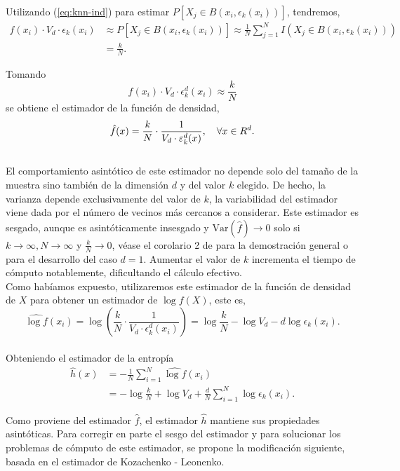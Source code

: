 \documentclass[12pt,a4paper]{report} %
\newcommand{\Var}{\text{Var}}
\theoremstyle{definition}
\begin{document}
Utilizando (\ref{eq:knn-ind}) para estimar $P[X_j\in B(x_i,\epsilon_k(x_i))]$, tendremos,\begin{align*}
f(x_i)\cdot V_d \cdot \epsilon_k(x_i) &\approx P[X_j\in B(x_i,\epsilon_k(x_i))]\approx  \frac{1}{N} \sum_{j=1}^NI\left(X_j\in B\left(x_i,\epsilon_k(x_i)\right)\right)\\ &= \frac{k}{N}.
\end{align*}

Tomando\[
f(x_i)\cdot V_d \cdot \epsilon^d_k(x_i) \approx \frac{k}{N}
\]
se obtiene el estimador de la función de densidad,
\[
\hat{f}(x) = \frac{k}{N}\cdot\frac{1}{V_d \cdot \varepsilon^d_k(x)},\quad \forall x\in \relax{R}^d.
\]\\[-10pt]

El comportamiento asintótico de este estimador no depende solo del tamaño de la muestra sino también de la dimensión $d$ y del valor $k$ elegido. De hecho, la varianza depende exclusivamente del valor de $k$, la variabilidad del estimador viene dada por el número de vecinos más cercanos a considerar. Este estimador es sesgado, aunque es asintóticamente insesgado y $\Var\left (\hat{f}\right)\to 0$ solo si $k\to \infty, N \to \infty$ y $\frac{k}{N} \to 0$, véase el corolario 2 de \cite{inproceedings} para la demostración general o \cite{stat} para el desarrollo del caso $d=1$. Aumentar el valor de $k$ incrementa el tiempo de cómputo notablemente, dificultando el cálculo efectivo.\\

Como habíamos expuesto, utilizaremos este estimador de la función de densidad de $X$ para obtener un estimador de $\log f(X)$, este es,\[
\widehat{\log f}(x_i) = \log\left ( \frac{k}{N}\cdot\frac{1}{V_d \cdot \epsilon^d_k(x_i)} \right ) = \log\frac{k}{N} - \log V_d - d\log  \epsilon_k(x_i).
\]\\[-10pt]

Obteniendo el estimador de la entropía
\begin{align*}
\hat{h}(x) &= -\frac{1}{N} \sum_{i=1}^N \widehat{\log f}(x_i)\\
  &= - \log\frac{k}{N} + \log V_d +  \frac{d}{N} \sum_{i=1}^N\log  \epsilon_k(x_i).
\end{align*}

Como proviene del estimador $\hat{f}$, el estimador $\hat{h}$ mantiene sus propiedades asintóticas. Para corregir en parte el sesgo del estimador y para solucionar los problemas de cómputo de este estimador, se propone la modificación siguiente, basada en el estimador de Kozachenko - Leonenko. \\
\end{document}
